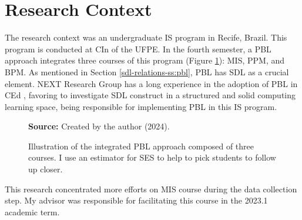 \section{Research Context}
\label{res-des-sec:context}

The research context was an undergraduate \gls{IS} program in Recife, Brazil. This program is conducted at \gls{CIn} of the \acrfull{UFPE}. In the fourth semester, a \acrfull{PBL} approach integrates three courses of this program (Figure \ref{fig:pbl-group}): \gls{MIS}, \gls{PPM}, and \gls{BPM}. As mentioned in Section \ref{sdl-relations-ss:pbl}, \gls{PBL} has \acrfull{SDL} as a crucial element. \gls{NEXT} Research Group has a long experience in the adoption of \gls{PBL} in \acrfull{CEd} \cite{santos:2021}, favoring to investigate \gls{SDL} construct in a structured and solid computing learning space, being responsible for implementing \gls{PBL} in this \gls{IS} program.

\begin{figure}[ht!]
\centering

\caption{\textmd{Illustration of the integrated \acrshort{PBL} approach composed of three courses. I use an estimator for \acrfull{SES} to help to pick students to follow up closer.}}
\label{fig:pbl-group}

\par\medskip\ABNTEXfontereduzida\selectfont\textbf{Source:} Created by the author (2024).
\end{figure}

This research concentrated more efforts on \gls{MIS} course during the data collection step. My advisor was responsible for facilitating this course in the 2023.1 academic term.

